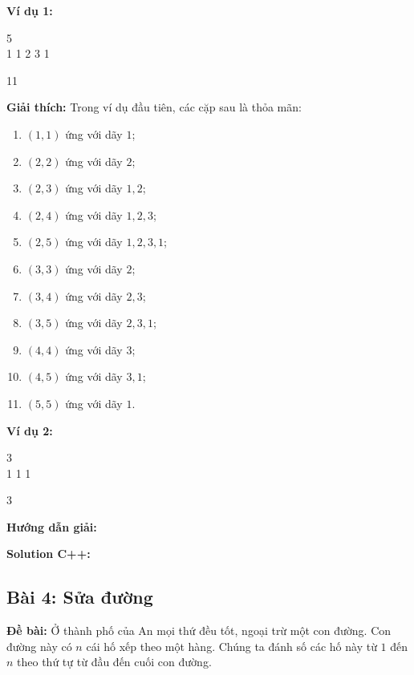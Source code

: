 \documentclass[12pt]{scrartcl}  %
\begin{document}
\textbf{Ví dụ 1:}
\begin{tcolorbox}[colback=gray!5!white, colframe=blue!50!black, title=Input]
5\\
1 1 2 3 1
\end{tcolorbox}
\begin{tcolorbox}[colback=gray!5!white, colframe=green!50!black, title=Output]
11
\end{tcolorbox}

\textbf{Giải thích:}
Trong ví dụ đầu tiên, các cặp sau là thỏa mãn:

\begin{enumerate}
\item $(1, 1)$ ứng với dãy $1$;
\item $(2, 2)$ ứng với dãy $2$;
\item $(2, 3)$ ứng với dãy $1, 2$;
\item $(2, 4)$ ứng với dãy $1, 2, 3$;
\item $(2, 5)$ ứng với dãy $1, 2, 3, 1$;
\item $(3, 3)$ ứng với dãy $2$;
\item $(3, 4)$ ứng với dãy $2, 3$;
\item $(3, 5)$ ứng với dãy $2, 3, 1$;
\item $(4, 4)$ ứng với dãy $3$;
\item $(4, 5)$ ứng với dãy $3, 1$;
\item $(5, 5)$ ứng với dãy $1$.
\end{enumerate}

\textbf{Ví dụ 2:}
\begin{tcolorbox}[colback=gray!5!white, colframe=blue!50!black, title=Input]
3\\
1 1 1
\end{tcolorbox}
\begin{tcolorbox}[colback=gray!5!white, colframe=green!50!black, title=Output]
3
\end{tcolorbox}

\textbf{Hướng dẫn giải:}

\textbf{Solution C++:}

\subsection{Bài 4: Sửa đường}

\textbf{Đề bài:}
Ở thành phố của An mọi thứ đều tốt, ngoại trừ một con đường. Con đường này có $n$ cái hố xếp theo một hàng. Chúng ta đánh số các hố này từ $1$ đến $n$ theo thứ tự từ đầu đến cuối con đường.
\end{document}
